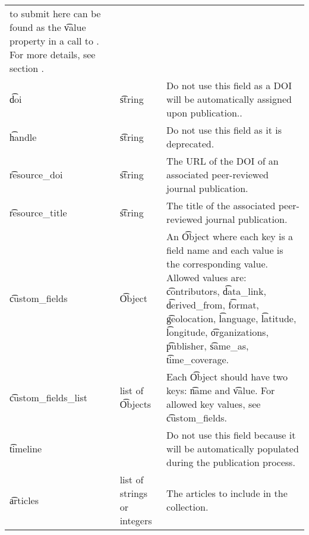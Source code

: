 \begin{tabularx}{\textwidth}{*{2}{!{\VRule[-1pt]}l}!{\VRule[-1pt]}X}
                                              to submit here can be found as
                                              the \t{value} property in a call
                                              to . For more
                                              details, see section
                                              .\\
  \t{doi}            & \t{string}           & Do not use this field as a DOI
                                              will be automatically assigned
                                              upon publication..\\
  \t{handle}         & \t{string}           & Do not use this field as it is
                                              deprecated.\\
  \t{resource\_doi}  & \t{string}           & The URL of the DOI of an
                                              associated peer-reviewed
                                              journal publication.\\
  \t{resource\_title} & \t{string}          & The title of the associated
                                              peer-reviewed journal
                                              publication.\\
  \t{custom\_fields} & \t{Object}           & An \t{Object} where each key is a
                                              field name and each value is the
                                              corresponding value. Allowed values
                                              are: \t{contributors}, \t{data\_link},
                                              \t{derived\_from}, \t{format},
                                              \t{geolocation}, \t{language},
                                              \t{latitude}, \t{longitude},
                                              \t{organizations}, \t{publisher},
                                              \t{same\_as}, \t{time\_coverage}.\\
  \t{custom\_fields\_list} & list of \t{Objects} & Each \t{Object} should have
                                              two keys: \t{name} and
                                              \t{value}. For allowed key values,
                                              see \t{custom\_fields}.\\
  \t{timeline}       &                      & Do not use this field because it
                                              will be automatically populated
                                              during the publication process.\\
  \t{articles}       & list of strings or integers & The articles to include
                                              in the collection.
\end{tabularx}

